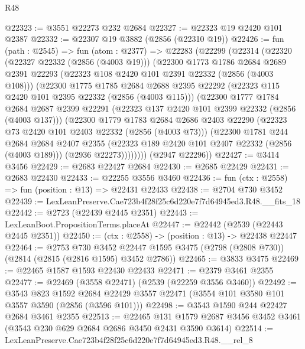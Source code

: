 \begin{lexlean}{R48}
\begin{coremodule}
@22323 := @3551 @22273 @232 @2684
@22327 := @22323 @19 @2420 @101 @2387
@22332 := @22307 @19 @3882 (@2856 (@22310 @19))
@22426 := fun (path : @2545) =>
  fun (atom : @2377) =>
  @22283
    (@22299
      (@22314
        (@22320
          (@22327 @22332 (@2856 (@4003 @19)))
          (@22300
            @1773
            @1786
            @2684
            @2689
            @2391
            @22293
            (@22323 @108 @2420 @101 @2391 @22332 (@2856 (@4003 @108)))
            (@22300
              @1775
              @1785
              @2684
              @2688
              @2395
              @22292
              (@22323 @115 @2420 @101 @2395 @22332 (@2856 (@4003 @115)))
              (@22300
                @1777
                @1784
                @2684
                @2687
                @2399
                @22291
                (@22323 @137 @2420 @101 @2399 @22332 (@2856 (@4003 @137)))
                (@22300
                  @1779
                  @1783
                  @2684
                  @2686
                  @2403
                  @22290
                  (@22323 @73 @2420 @101 @2403 @22332 (@2856 (@4003 @73)))
                  (@22300
                    @1781
                    @244
                    @2684
                    @2684
                    @2407
                    @2355
                    (@22323 @189 @2420 @101 @2407 @22332 (@2856 (@4003 @189)))
                    (@2936 @22273))))))))
      (@2947 @22296))
@22427 := @3414 @3456
@22429 := @2683 @22427 @2684
@22430 := @2685 @22429
@22431 := @2683 @22430
@22433 := @22255 @3556 @3460
@22436 := fun (ctx : @2558) => fun (position : @13) => @22431 @22433
@22438 := @2704 @730 @3452
@22439 := LexLeanPreserve.Cae723b4f28f25c6d220e7f7d64945ed3.R48.__fits_18
@22442 := @2723 (@22439 @2445 @2351)
@22443 := LexLeanBoot.PropositionTerms.placeAt
@22447 := @22442 (@2539 (@22443 @2445 @2351))
@22450 := (ctx : @2558) -> (position : @13) -> @22438 @22447
@22464 := @2753
    @730
    @3452
    @22447
    @1595
    @3475
    (@2798 (@2808 @730))
    (@2814 (@2815 (@2816 @1595) @3452 @2786))
@22465 := @3833 @3475
@22469 := @22465 @1587 @1593 @22430 @22433
@22471 := @2379 @3461 @2355
@22477 := @22469 (@3558 @22471) (@2539 (@22259 @3556 @3460))
@22492 := @3543
    @823
    @1592
    @2684
    @22429
    @3557
    @22471
    (@3554 @101 @3580 @101 @3557 @3590 (@2856 (@3596 @101)))
@22498 := @3543 @1590 @244 @22427 @2684 @3461 @2355
@22513 := @22465
    @131
    @1579
    @2687
    @3456
    @3452
    @3461
    (@3543 @230 @629 @2684 @2686 @3450 @2431 @3590 @3614)
@22514 := LexLeanPreserve.Cae723b4f28f25c6d220e7f7d64945ed3.R48.__rel_8

\end{coremodule}
\end{lexlean}
